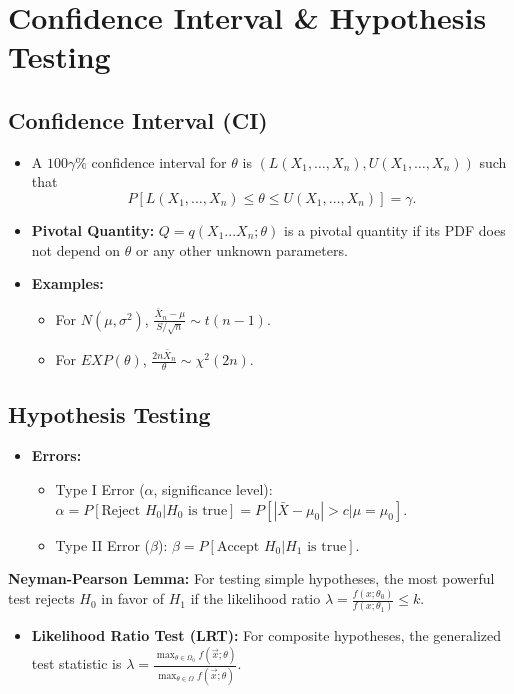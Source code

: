 \documentclass[12pt,a4paper]{article}
\begin{document}
\section{Confidence Interval \& Hypothesis Testing}

\subsection{Confidence Interval (CI)}
\begin{itemize}
    \item A $100\gamma\%$ confidence interval for $\theta$ is
    $(L(X_1,\ldots,X_n), U(X_1,\ldots,X_n))$ such that
    \[
        P\!\left[
            L(X_1,\ldots,X_n) \le \theta \le U(X_1,\ldots,X_n)
        \right] = \gamma.
    \]
    \item \textbf{Pivotal Quantity:} $Q = q(X_1...X_n; \theta)$ is a pivotal quantity if its PDF does not depend on $\theta$ or any other unknown parameters.
    \item \textbf{Examples:}
    \begin{itemize}
        \item For $N(\mu, \sigma^2)$, $\frac{\bar{X}_n - \mu}{S/\sqrt{n}} \sim t(n-1)$.
        \item For $EXP(\theta)$, $\frac{2n\bar{X}_n}{\theta} \sim \chi^2(2n)$.
    \end{itemize}
\end{itemize}

\subsection{Hypothesis Testing}
\begin{itemize}
    \item \textbf{Errors:}
    \begin{itemize}
        \item Type I Error ($\alpha$, significance level): $\alpha = P[\text{Reject } H_0 | H_0 \text{ is true}] = P[|\bar{X}-\mu_0|>c | \mu=\mu_0]$.
        \item Type II Error ($\beta$): $\beta = P[\text{Accept } H_0 | H_1 \text{ is true}]$.
    \end{itemize}
\end{itemize}

\begin{thmbox}[title=Most Powerful Test \& Neyman-Pearson]
\textbf{Neyman-Pearson Lemma:} For testing simple hypotheses, the most powerful test rejects $H_0$ in favor of $H_1$ if the likelihood ratio $\lambda = \frac{f(x;\theta_0)}{f(x;\theta_1)} \le k$.
\end{thmbox}

\begin{itemize}
    \item \textbf{Likelihood Ratio Test (LRT):} For composite hypotheses, the generalized test statistic is $\lambda = \frac{\max_{\theta \in \Omega_0} f(\vec{x};\theta)}{\max_{\theta \in \Omega} f(\vec{x};\theta)}$.
\end{itemize}
\end{document}
